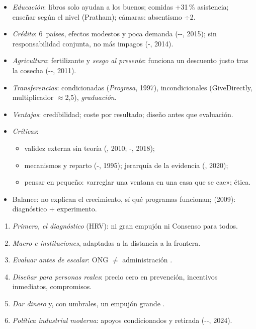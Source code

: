 \documentclass{article}
\begin{document}
\begin{columnas}
\begin{itemize}
\item \emph{Educación}: libros solo ayudan a los buenos; comidas +31\,\% asistencia; enseñar según el nivel (Pratham); cámaras: absentismo ÷2.
\item \emph{Crédito}: 6~países, efectos modestos y poca demanda (--, 2015); sin responsabilidad conjunta, no más impagos (-, 2014).
\item \emph{Agricultura}: fertilizante y \emph{sesgo al presente}: funciona un descuento justo tras la cosecha (--, 2011).
\item \emph{Transferencias}: condicionadas (\emph{Progresa}, 1997), incondicionales (GiveDirectly, multiplicador $\approx$2,5), \emph{graduación}.
\end{itemize}
\begin{itemize}
\item \emph{Ventajas}: credibilidad; coste por resultado; diseño antes que evaluación.
\item \emph{Críticas}:
  \begin{itemize}
  \item validez externa sin teoría (, 2010; -, 2018);
  \item mecanismos y reparto (-, 1995); jerarquía de la evidencia (, 2020);
  \item pensar en pequeño: «arreglar una ventana en una casa que se cae»; ética.
  \end{itemize}
\item Balance: no explican el crecimiento, sí qué programas funcionan;  (2009): diagnóstico + experimento.
\end{itemize}

\begin{enumerate}
\item \emph{Primero, el diagnóstico} (HRV): ni gran empujón ni Consenso para todos.
\item \emph{Macro e instituciones}, adaptadas a la distancia a la frontera.
\item \emph{Evaluar antes de escalar}: ONG $\neq$ administración .
\item \emph{Diseñar para personas reales}: precio cero en prevención, incentivos inmediatos, compromisos.
\item \emph{Dar dinero} y, con umbrales, un empujón grande .
\item \emph{Política industrial moderna}: apoyos condicionados y retirada (--, 2024).
\end{enumerate}


\end{columnas}
\end{document}
